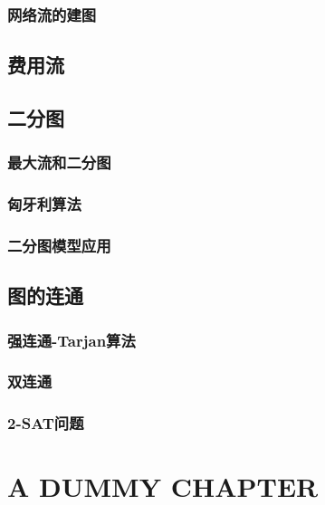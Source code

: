 \documentclass{ctexbook}
\begin{document}
  \subsection{网络流的建图}
  \section{费用流}
  \section{二分图}
  \subsection{最大流和二分图}
  \subsection{匈牙利算法}
  \subsection{二分图模型应用}
  \section{图的连通}
  \subsection{强连通-Tarjan算法}
  \subsection{双连通}
  \subsection{2-SAT问题}
  \chapter{A DUMMY CHAPTER}
\end{document}
